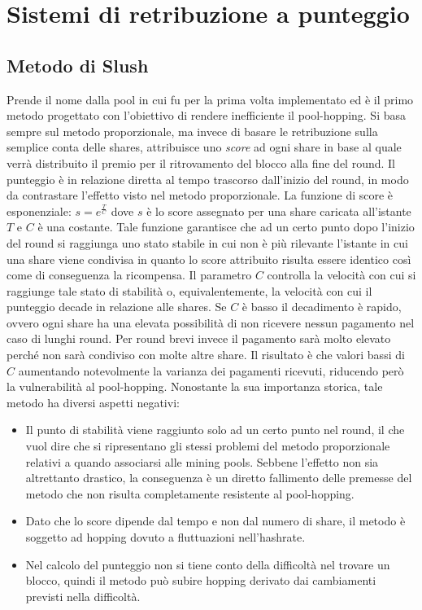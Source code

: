 \section{Sistemi di retribuzione a punteggio}

\subsection{Metodo di Slush}

Prende il nome dalla pool in cui fu per la prima volta implementato ed è il primo metodo progettato con l'obiettivo di rendere inefficiente il pool-hopping.
Si basa sempre sul metodo proporzionale, ma invece di basare le retribuzione sulla semplice conta delle shares, attribuisce uno \emph{score} ad ogni share in base al quale verrà distribuito il premio per il ritrovamento del blocco alla fine del round.
Il punteggio è in relazione diretta al tempo trascorso dall'inizio del round, in modo da contrastare l'effetto visto nel metodo proporzionale. La funzione di score è esponenziale: $s=e^{\frac{T}{C}}$ dove $s$ è lo score assegnato per una share caricata all'istante $T$ e $C$ è una costante.
Tale funzione garantisce che ad un certo punto dopo l'inizio del round si raggiunga uno stato stabile in cui non è più rilevante l'istante in cui una share viene condivisa in quanto lo score attribuito risulta essere identico così come di conseguenza la ricompensa.
Il parametro $C$ controlla la velocità con cui si raggiunge tale stato di stabilità o, equivalentemente, la velocità con cui il punteggio decade in relazione alle shares. Se $C$ è basso il decadimento è rapido, ovvero ogni share ha una elevata possibilità di non ricevere nessun pagamento nel caso di lunghi round. Per round brevi invece il pagamento sarà molto elevato perché non sarà condiviso con molte altre share.
Il risultato è che valori bassi di $C$ aumentando notevolmente la varianza dei pagamenti ricevuti, riducendo però la vulnerabilità al pool-hopping.
Nonostante la sua importanza storica, tale metodo ha diversi aspetti negativi:

\begin{itemize}
	\item Il punto di stabilità viene raggiunto solo ad un certo punto nel round, il che vuol dire che si ripresentano gli stessi problemi del metodo proporzionale relativi a quando associarsi alle mining pools. Sebbene l'effetto non sia altrettanto drastico, la conseguenza è un diretto fallimento delle premesse del metodo che non risulta completamente resistente al pool-hopping.
	\item Dato che lo score dipende dal tempo e non dal numero di share, il metodo è soggetto ad hopping dovuto a fluttuazioni nell'hashrate.
	\item Nel calcolo del punteggio non si tiene conto della difficoltà nel trovare un blocco, quindi il metodo può subire hopping derivato dai cambiamenti previsti nella difficoltà.
\end{itemize}

